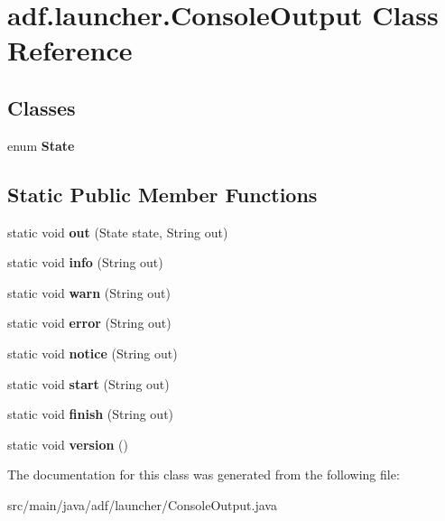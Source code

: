 \hypertarget{classadf_1_1launcher_1_1ConsoleOutput}{}\section{adf.\+launcher.\+Console\+Output Class Reference}
\label{classadf_1_1launcher_1_1ConsoleOutput}
\subsection*{Classes}
\begin{DoxyCompactItemize}
\item 
enum {\bfseries State}
\end{DoxyCompactItemize}
\subsection*{Static Public Member Functions}
\begin{DoxyCompactItemize}
\item 
\hypertarget{classadf_1_1launcher_1_1ConsoleOutput_a489dce085b6f89ac2b703fcd966cb721}{}\label{classadf_1_1launcher_1_1ConsoleOutput_a489dce085b6f89ac2b703fcd966cb721} 
static void {\bfseries out} (State state, String out)
\item 
\hypertarget{classadf_1_1launcher_1_1ConsoleOutput_af98d7716ff42556c2e05d9574a65800b}{}\label{classadf_1_1launcher_1_1ConsoleOutput_af98d7716ff42556c2e05d9574a65800b} 
static void {\bfseries info} (String out)
\item 
\hypertarget{classadf_1_1launcher_1_1ConsoleOutput_ab0e6c05ce0706c70b485609765727071}{}\label{classadf_1_1launcher_1_1ConsoleOutput_ab0e6c05ce0706c70b485609765727071} 
static void {\bfseries warn} (String out)
\item 
\hypertarget{classadf_1_1launcher_1_1ConsoleOutput_aedb5bbfe8ed04f70ed1a68336e9eb4eb}{}\label{classadf_1_1launcher_1_1ConsoleOutput_aedb5bbfe8ed04f70ed1a68336e9eb4eb} 
static void {\bfseries error} (String out)
\item 
\hypertarget{classadf_1_1launcher_1_1ConsoleOutput_ad780ff9a8c8301c2589a1e127b87364d}{}\label{classadf_1_1launcher_1_1ConsoleOutput_ad780ff9a8c8301c2589a1e127b87364d} 
static void {\bfseries notice} (String out)
\item 
\hypertarget{classadf_1_1launcher_1_1ConsoleOutput_a268f0b3d9513f834dc4be545cc74c6fd}{}\label{classadf_1_1launcher_1_1ConsoleOutput_a268f0b3d9513f834dc4be545cc74c6fd} 
static void {\bfseries start} (String out)
\item 
\hypertarget{classadf_1_1launcher_1_1ConsoleOutput_aa24a2f065c7f578465d966304f992f57}{}\label{classadf_1_1launcher_1_1ConsoleOutput_aa24a2f065c7f578465d966304f992f57} 
static void {\bfseries finish} (String out)
\item 
\hypertarget{classadf_1_1launcher_1_1ConsoleOutput_a8ea55b53f57fa18caba623dd841fbac6}{}\label{classadf_1_1launcher_1_1ConsoleOutput_a8ea55b53f57fa18caba623dd841fbac6} 
static void {\bfseries version} ()
\end{DoxyCompactItemize}


The documentation for this class was generated from the following file\+:\begin{DoxyCompactItemize}
\item 
src/main/java/adf/launcher/Console\+Output.\+java\end{DoxyCompactItemize}
